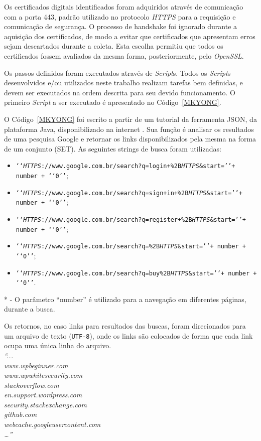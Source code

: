 		Os certificados digitais  identificados foram adquiridos através de comunicação com a porta 443, padrão utilizado no protocolo \textit{HTTPS} para a requisição e comunicação de segurança. O processo de handshake foi ignorado durante a aquisição dos certificados, de modo a evitar que certificados que apresentam erros sejam descartados durante a coleta. Esta escolha permitiu que todos os certificados fossem avaliados da mesma forma, posteriormente, pelo \textit{OpenSSL}.
		
		Os passos definidos foram executados através de \textit{Script}s. Todos os \textit{Script}s desenvolvidos e/ou utilizados neste trabalho realizam tarefas bem definidas, e devem ser  executados na ordem descrita para seu devido funcionamento. O primeiro \textit{Script} a ser executado é apresentado no Código~\ref{MKYONG}.
		
		
		O Código~\ref{MKYONG} foi escrito a partir de um tutorial da ferramenta JSON, da plataforma Java, disponibilizado na internet \cite{mkyong_url}. Sua função é analisar os resultados de uma pesquisa Google e retornar os links disponibilizados pela mesma na forma de um conjunto (SET). As seguintes strings de busca foram utilizadas:
		
		\begin{itemize}
			\item \texttt{\lq\lq \textit{HTTPS}://www.google.com.br/search?q=login+\%2B\textit{HTTPS}\&start=\rq\rq + number + \lq\lq0\rq\rq};
			\item \texttt{\lq\lq \textit{HTTPS}://www.google.com.br/search?q=sign+in+\%2B\textit{HTTPS}\&start=\rq\rq + number + \lq\lq0\rq\rq};
			\item \texttt{\lq\lq \textit{HTTPS}://www.google.com.br/search?q=register+\%2B\textit{HTTPS}\&start=\rq\rq + number + \lq\lq0\rq\rq};
			\item \texttt{\lq\lq \textit{HTTPS}://www.google.com.br/search?q=\%2B\textit{HTTPS}\&start=\rq\rq + number + \lq\lq0\rq\rq};
			\item \texttt{\lq\lq \textit{HTTPS}://www.google.com.br/search?q=buy\%2B\textit{HTTPS}\&start=\rq\rq + number + \lq\lq0\rq\rq}.
		\end{itemize}
		* - O parâmetro “number” é utilizado para a navegação em diferentes páginas, durante a busca.
		
		Os retornos, no caso links para resultados das buscas, foram direcionados para um arquivo de texto (\texttt{UTF-8}), onde os links são colocados de forma que cada link ocupa uma única linha do arquivo.\\
		\textit{“...\\
		www.wpbeginner.com\\
		www.wpwhitesecurity.com\\
		stackoverflow.com\\
		en.support.wordpress.com\\
		security.stackexchange.com\\
		github.com\\
		webcache.googleusercontent.com\\
		…”}
	
